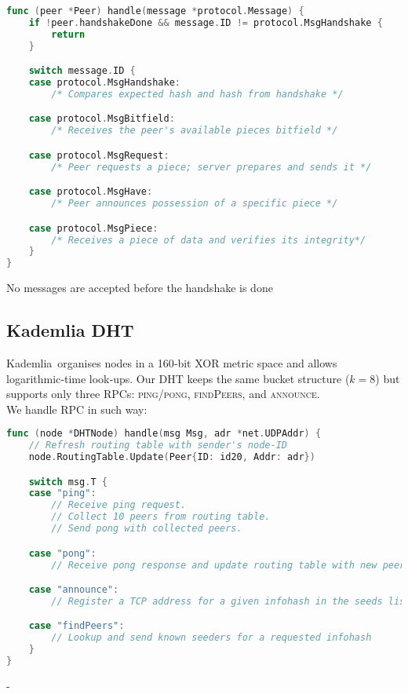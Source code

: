 \documentclass[11pt,a4paper]{article}
\begin{document}
\begin{lstlisting}[language=go]
  func (peer *Peer) handle(message *protocol.Message) {
    if !peer.handshakeDone && message.ID != protocol.MsgHandshake {
        return
    }

    switch message.ID {
    case protocol.MsgHandshake:
        /* Compares expected hash and hash from handshake */ 

    case protocol.MsgBitfield:
        /* Receives the peer's available pieces bitfield */

    case protocol.MsgRequest:
        /* Peer requests a piece; server prepares and sends it */

    case protocol.MsgHave:
        /* Peer announces possession of a specific piece */

    case protocol.MsgPiece:
        /* Receives a piece of data and verifies its integrity*/
    }
}
\end{lstlisting}
No messages are accepted before the handshake is done

\subsection{Kademlia DHT}
Kademlia\,\cite{maymounkov2002kademlia} organises nodes in a 160‑bit XOR metric space and allows logarithmic‑time look‑ups.
Our DHT keeps the same bucket structure (\(k{=}8\)) but supports only three RPCs: \textsc{ping}/\textsc{pong}, \textsc{findPeers}, and \textsc{announce}.
\\ We handle RPC in such way:
\begin{lstlisting}[language=go]
  func (node *DHTNode) handle(msg Msg, adr *net.UDPAddr) {
    // Refresh routing table with sender's node-ID
    node.RoutingTable.Update(Peer{ID: id20, Addr: adr})

    switch msg.T {
    case "ping":
        // Receive ping request. 
        // Collect 10 peers from routing table.
        // Send pong with collected peers.

    case "pong":
        // Receive pong response and update routing table with new peers

    case "announce":
        // Register a TCP address for a given infohash in the seeds list

    case "findPeers":
        // Lookup and send known seeders for a requested infohash
    }
}  
\end{lstlisting}
-
\end{document}
